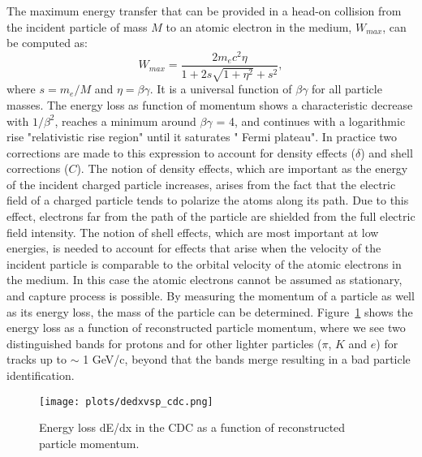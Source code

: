 The maximum energy transfer that can be provided in a head-on collision from the incident particle of mass $M$ to an atomic electron in the medium, $W_{max}$, can be computed as:
\begin{equation}
    \label{eq.3.2}
    W_{max} = \frac{2 m_e c^2 \eta}{1 + 2 s \sqrt{1 + \eta^2} + s^2},
\end{equation}
where $s = m_e/M$ and $\eta = \beta \gamma$.
It is a universal function of $\beta \gamma$ for all particle masses. The energy loss as function of momentum shows a characteristic decrease with $1/\beta^{2}$, reaches a minimum around $\beta \gamma$ = 4, and continues with a logarithmic rise "relativistic rise region" until it saturates " Fermi plateau". In practice two corrections are made to this expression to account for density effects ($\delta$) and shell corrections ($C$). The notion of density effects, which are important as the energy of the incident charged particle increases, arises from the fact that the electric field of a charged particle tends to polarize the atoms along its path. Due to this effect, electrons far from the path of the particle are shielded from the full electric field intensity. The notion of shell effects, which are most important at low energies, is needed to account for effects that arise when the velocity of the incident particle is comparable to the orbital velocity of the atomic electrons in the medium. In this case the atomic electrons cannot be assumed as stationary, and capture process is possible. By measuring the momentum of a particle as well as its energy loss, the mass of the particle can be determined. Figure~\ref{fig.3.1} shows the energy loss as a function of reconstructed particle momentum, where we see two distinguished bands for protons and for other lighter particles ($\pi$, $K$ and $e$) for tracks up to $\sim$ 1 GeV/c, beyond that the bands merge resulting in a bad particle identification.
\begin{figure}[H]
    \centering
    \texttt{[image: plots/dedxvsp\_cdc.png]}
    \caption{\label{fig.3.1}Energy loss dE/dx in the CDC as a function of reconstructed particle momentum.}
\end{figure}

